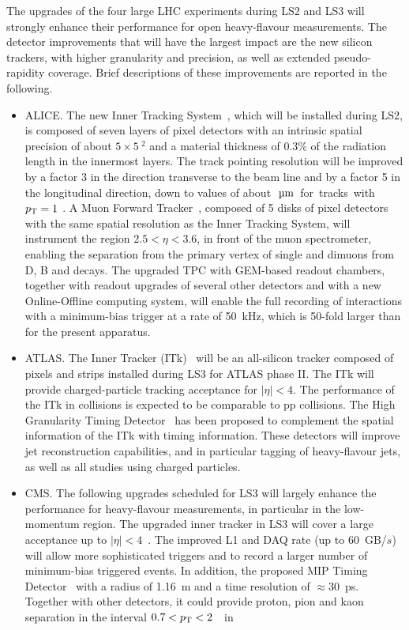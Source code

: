 The upgrades of the four large LHC experiments during LS2 and LS3 will strongly enhance their performance for open heavy-flavour measurements. The detector improvements that will have the largest impact are the new silicon trackers, with higher granularity and precision, as well as extended pseudo-rapidity coverage. Brief descriptions of these improvements are reported in the following.

\begin{itemize}
\item ALICE. The new Inner Tracking System~\cite{Abelev:1625842}, which will be installed during LS2, is composed of seven layers of pixel detectors with an intrinsic spatial precision of about $5\times 5~$\Uum$^2$ and a material thickness of 0.3\% of the radiation length in the innermost layers. The track pointing resolution will be improved by a factor 3 in the direction transverse to the beam line and by a factor 5 in the longitudinal direction, down to values of about \unit[20]{$\Uum$} for tracks with $p\sb{\scriptstyle\mathrm{T}}=1~$\UGeVc. A Muon Forward Tracker~\cite{CERN-LHCC-2015-001}, composed of 5 disks of pixel detectors with the same spatial resolution as the Inner Tracking System, will instrument the region $2.5<\eta<3.6$, in front of the muon spectrometer, enabling the separation from the primary vertex of single and dimuons from D, B and \PJGy decays. The upgraded TPC with GEM-based readout chambers, together with readout upgrades of several other detectors and with a new Online-Offline computing system, will enable the full recording of \PbPb interactions with a minimum-bias trigger at a rate of 50~kHz, which is 50-fold larger than for the present apparatus.    
\item ATLAS.  The Inner Tracker (ITk)~\cite{ATL-PHYS-PUB-2016-025} will be an all-silicon tracker composed of pixels and strips installed during LS3 for ATLAS phase II.  The ITk will provide charged-particle tracking acceptance for $|\eta|<4$.  The performance of the ITk in \PbPb collisions is expected to be comparable to pp collisions.  The High Granularity Timing Detector~\cite{Collaboration:2623663} has been proposed to complement the spatial information of the ITk with timing information.  These detectors will improve jet reconstruction capabilities, and in particular tagging of heavy-flavour jets, as well as all studies using charged particles.
\item CMS. The following upgrades scheduled for LS3 will largely enhance the performance for heavy-flavour measurements, in particular in the low-momentum region. The upgraded inner tracker in LS3 will cover a large acceptance up to $|\eta|<4$~\cite{Contardo:2020886}. The improved L1 and DAQ rate (up to 60~GB/$s$) will allow more sophisticated triggers and to record a larger number of minimum-bias triggered events. In addition, the proposed MIP Timing Detector~\cite{Collaboration:2272264} with a radius of 1.16~m and a time resolution of $\approx 30$~ps. Together with other detectors, it could provide proton, pion and kaon separation in the interval $0.7<p\sb{\scriptstyle\mathrm{T}} < 2$~\UGeVc~in 

\end{itemize}
